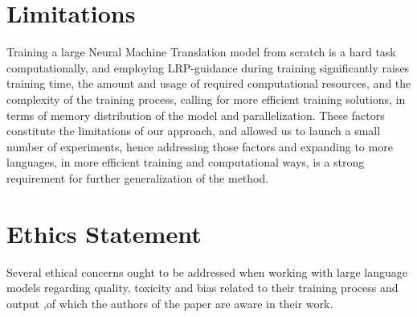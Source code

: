 \documentclass[11pt]{article}
\begin{document}
\section{Limitations}
Training a large Neural Machine Translation model from scratch is a hard task computationally, 
and employing LRP-guidance during training significantly raises training time, the amount and usage of required computational resources, and the complexity of the training process, calling for more efficient training solutions, in terms of memory distribution of the model and parallelization. These factors constitute the limitations of our approach, and allowed us to launch a small number of experiments, hence addressing those factors and expanding to more languages, in more efficient training and computational ways, is a strong requirement for further generalization of the method.

\section{Ethics Statement}
Several ethical concerns ought to be addressed when working with large language models regarding quality, toxicity and bias related to their training process and output \cite{10.1145/3442188.3445922,chowdhery2022palm,brown2020language},of which the authors of the paper are aware in their work.

\begin{comment}
\section*{Acknowledgements}
\end{comment}
\newpage



\end{document}

